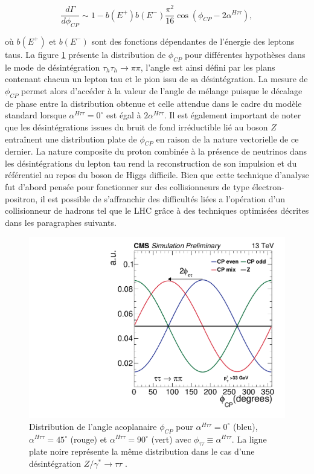 \begin{equation}
    \frac{d\Gamma}{d\phi_{CP}}\sim 1-b(E^+)b(E^-)\frac{\pi^2}{16}\cos(\phi_{CP}-2\alpha^{H\tau\tau}),
\label{crosssection}
\end{equation}

où $b(E^+)$ et $b(E^-)$ sont des fonctions dépendantes de l'énergie des leptons taus. La figure \ref{phiCP2} présente la distribution de $\phi_{CP}$ pour différentes hypothèses dans le mode de désintégration $\tau_h\tau_h\rightarrow\pi\pi$, l'angle est ainsi défini par les plans contenant chacun un lepton tau et le pion issu de sa désintégration. La mesure de $\phi_{CP}$ permet alors d'accéder à la valeur de l'angle de mélange puisque le décalage de phase entre la distribution obtenue et celle attendue dans le cadre du modèle standard lorsque $\alpha^{H\tau\tau}=0^{\circ}$ est égal à $2\alpha^{H\tau\tau}$. Il est également important de noter que les désintégrations issues du bruit de fond irréductible lié au boson $Z$ entraînent une distribution plate de $\phi_{CP}$ en raison de la nature vectorielle de ce dernier. La nature composite du proton combinée à la présence de neutrinos dans les désintégrations du lepton tau rend la reconstruction de son impulsion et du référentiel au repos du boson de Higgs difficile. Bien que cette technique d'analyse fut d'abord pensée pour fonctionner sur des collisionneurs de type électron-positron, il est possible de s'affranchir des difficultés liées a l'opération d'un collisionneur de hadrons tel que le LHC grâce à des techniques optimisées décrites dans les paragraphes suivants.\\

\begin{figure}
\centering
    \includegraphics[scale=0.5]{Chapitre6/Images/Figure_001.pdf} 
    \caption{Distribution de l'angle acoplanaire $\phi_{CP}$ pour $\alpha^{H\tau\tau}=0^{\circ}$ (bleu), $\alpha^{H\tau\tau}=45^{\circ}$ (rouge) et $\alpha^{H\tau\tau}=90^{\circ}$ (vert) avec $\phi_{\tau\tau}\equiv\alpha^{H\tau\tau}$. La ligne plate noire représente la même distribution dans le cas d'une désintégration $Z/\gamma^*\rightarrow\tau\tau$ \cite{Htautau}.}
    \label{phiCP2}
\end{figure}

